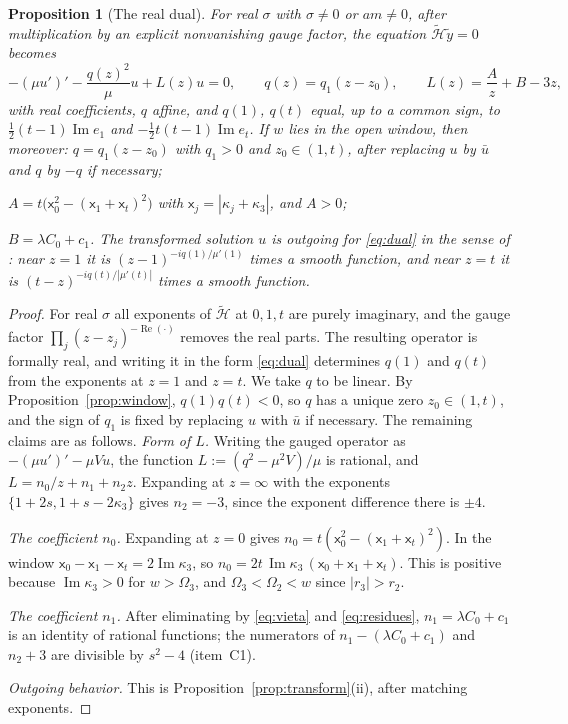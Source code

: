 \documentclass[11pt]{amsart}
\newtheorem{proposition}[theorem]{Proposition}
\theoremstyle{definition}
\theoremstyle{remark}
\numberwithin{equation}{section}
\renewcommand{\Im}{\operatorname{Im}}
\renewcommand{\Re}{\operatorname{Re}}
\begin{document}
\begin{proposition}[The real dual]\label{prop:dual}
For real $\sigma$ with $\sigma\ne0$ or $am\ne0$, after multiplication by an explicit nonvanishing gauge factor, the equation
$\widetilde{\mathcal H}\tilde y=0$ becomes
\begin{equation}\label{eq:dual}
-(\mu u')'-\frac{q(z)^2}{\mu}u+L(z)u=0,\qquad q(z)=q_1(z-z_0),\qquad L(z)=\frac{A}{z}+B-3z,
\end{equation}
with real coefficients, $q$ affine, and $q(1)$, $q(t)$ equal, up to a common sign, to
$\frac12(t-1)\Im e_1$ and $-\frac12t(t-1)\Im e_t$. If $w$ lies in the open window, then moreover:
$q=q_1(z-z_0)$ with $q_1>0$ and $z_0\in(1,t)$, after replacing $u$ by $\bar u$ and $q$ by $-q$ if necessary;

$A=t\big(\mathsf x_0^2-(\mathsf x_1+\mathsf x_t)^2\big)$ with $\mathsf x_j=|\kappa_j+\kappa_3|$, and $A>0$;

$B=\lambda C_0+c_1$.
The transformed solution $u$ is outgoing for \eqref{eq:dual} in the sense of \cite[(3.4)]{Hin26}: near $z=1$ it is
$(z-1)^{-iq(1)/\mu'(1)}$ times a smooth function, and near $z=t$ it is $(t-z)^{-iq(t)/|\mu'(t)|}$ times a smooth
function.
\end{proposition}

\begin{proof}
For real $\sigma$ all exponents of $\widetilde{\mathcal H}$ at $0,1,t$ are purely imaginary, and the gauge factor $\prod_j(z-z_j)^{-\Re(\cdot)}$ removes the
real parts. The resulting operator is formally real, and writing it in the form \eqref{eq:dual} determines $q(1)$ and
$q(t)$ from the exponents at $z=1$ and $z=t$. We take $q$ to be linear. By Proposition~\ref{prop:window},
$q(1)q(t)<0$, so $q$ has a unique zero $z_0\in(1,t)$, and the sign of $q_1$ is fixed by replacing $u$ with $\bar u$
if necessary. The remaining claims are as follows.
\emph{Form of $L$.} Writing the gauged operator as $-(\mu u')'-\mu Vu$, the function $L:=(q^2-\mu^2V)/\mu$ is rational, and $L=n_0/z+n_1+n_2z$. Expanding at
$z=\infty$ with the exponents $\{1+2s,1+s-2\kappa_3\}$ gives $n_2=-3$, since the exponent difference there is $\pm4$.

\emph{The coefficient $n_0$.} Expanding at $z=0$ gives $n_0=t(\mathsf x_0^2-(\mathsf x_1+\mathsf x_t)^2)$. In the window
$\mathsf x_0-\mathsf x_1-\mathsf x_t=2\Im\kappa_3$, so $n_0=2t\,\Im\kappa_3\,(\mathsf x_0+\mathsf x_1+\mathsf x_t)$. This is positive because $\Im\kappa_3>0$ for
$w>\Omega_3$, and $\Omega_3<\Omega_2<w$ since $|r_3|>r_2$.

\emph{The coefficient $n_1$.} After eliminating by \eqref{eq:vieta} and \eqref{eq:residues}, $n_1=\lambda C_0+c_1$
is an identity of rational functions; the numerators of $n_1-(\lambda C_0+c_1)$ and $n_2+3$ are divisible by $s^2-4$
(item~C1).

\emph{Outgoing behavior.} This is Proposition~\ref{prop:transform}(ii), after matching exponents.
\end{proof}
\end{document}
